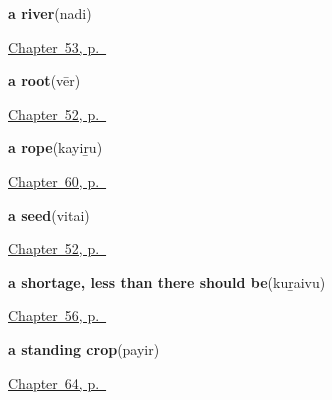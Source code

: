 \noindent\begin{minipage}[t]{\linewidth}
\raggedright
\textbf{a river}\enspace\emph{}\enspace(nadi)\par
\footnotesize \hyperref[ch:ta-the-land]{Chapter~53, p.~\pageref*{ch:ta-the-land}}
\end{minipage}\par\smallskip

\noindent\begin{minipage}[t]{\linewidth}
\raggedright
\textbf{a root}\enspace\emph{}\enspace(vēr)\par
\footnotesize \hyperref[ch:ta-a-tree]{Chapter~52, p.~\pageref*{ch:ta-a-tree}}
\end{minipage}\par\smallskip

\noindent\begin{minipage}[t]{\linewidth}
\raggedright
\textbf{a rope}\enspace\emph{}\enspace(kayiṟu)\par
\footnotesize \hyperref[ch:ta-things-people-make]{Chapter~60, p.~\pageref*{ch:ta-things-people-make}}
\end{minipage}\par\smallskip

\noindent\begin{minipage}[t]{\linewidth}
\raggedright
\textbf{a seed}\enspace\emph{}\enspace(vitai)\par
\footnotesize \hyperref[ch:ta-a-tree]{Chapter~52, p.~\pageref*{ch:ta-a-tree}}
\end{minipage}\par\smallskip

\noindent\begin{minipage}[t]{\linewidth}
\raggedright
\textbf{a shortage, less than there should be}\enspace\emph{}\enspace(kuṟaivu)\par
\footnotesize \hyperref[ch:ta-how-much]{Chapter~56, p.~\pageref*{ch:ta-how-much}}
\end{minipage}\par\smallskip

\noindent\begin{minipage}[t]{\linewidth}
\raggedright
\textbf{a standing crop}\enspace\emph{}\enspace(payir)\par
\footnotesize \hyperref[ch:ta-the-harvest]{Chapter~64, p.~\pageref*{ch:ta-the-harvest}}
\end{minipage}\par\smallskip

